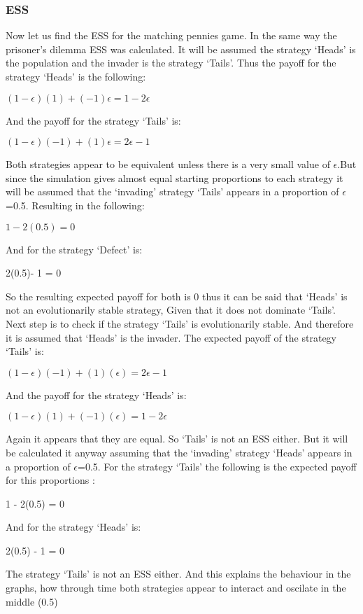 \subsubsection{ESS}
Now let us find the ESS for the matching pennies game. In the same way the prisoner's dilemma ESS was calculated. It will be assumed the strategy  `Heads' is the population and the invader is the strategy `Tails'. Thus the payoff for the strategy `Heads' is the following:
\begin{center}
$(1-{\epsilon})(1) + (-1){\epsilon} = 1 - 2{\epsilon}$
\end{center}
And the payoff for the strategy `Tails' is:
\begin{center}
$(1-{\epsilon})(-1) + (1){\epsilon} = 2{\epsilon} - 1$
\end{center}
Both strategies appear to be equivalent unless there is a very small value of $\epsilon$.But since the simulation gives almost equal starting proportions to each strategy it will be assumed that the `invading' strategy `Tails' appears in a proportion of $\epsilon$=0.5. Resulting in the following:
\begin{center}
$1- 2(0.5) = 0$
\end{center}
And for the strategy `Defect' is:
\begin{center}
 2(0.5)- 1 = 0
\end{center}
So the resulting expected payoff for both is 0 thus it can be said that `Heads' is not an evolutionarily stable strategy, Given that it does not dominate `Tails'.
Next step is to check if the strategy `Tails' is evolutionarily stable. And therefore it is assumed that `Heads' is the invader. The expected payoff of the strategy `Tails' is:
\begin{center}
$(1-{\epsilon})(-1) + (1)({\epsilon}) = 2{\epsilon} -1$
\end{center}
And the payoff for the strategy `Heads' is:
\begin{center}
$(1-{\epsilon})(1) + (-1)({\epsilon}) =  1 - 2{\epsilon}$
\end{center}
Again it appears that they are equal. So `Tails' is not an ESS either. But it will be calculated it anyway assuming that the `invading' strategy `Heads' appears in a proportion of $\epsilon$=0.5. For the strategy `Tails' the following is the expected payoff for this proportions :
\begin{center}
1 -  2(0.5) = 0
\end{center}
And for the strategy `Heads' is:
\begin{center}
 2(0.5) - 1 = 0
\end{center}
The strategy `Tails' is not an ESS either. And this explains the behaviour in the graphs, how through time both strategies appear to interact and oscilate in the middle (0.5)



